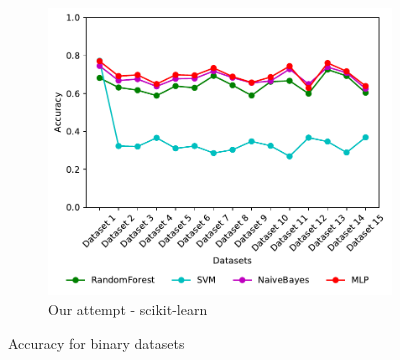 \begin{figure}[H]
\begin{subfigure}[t]{0.4\textwidth}
        \includegraphics[width=\linewidth, page = 1]{images/accuracy}
        \caption{Our attempt - scikit-learn}
    \end{subfigure}
    \caption{Accuracy for binary datasets}
    \label{fig:weka_acc2}
\end{figure}

